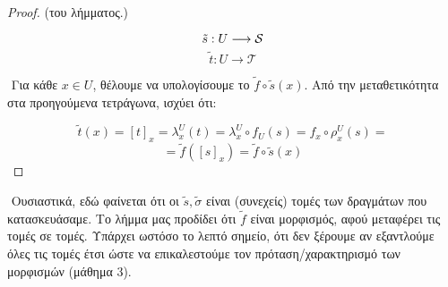 \begin{proof} (του λήμματος.)

    $$\tilde{s}:U \longrightarrow \mathcal{S}$$
    $$\tilde{t}: U \longrightarrow \mathcal{T}$$

    \begin{figure}[H]
        \centering
    \end{figure}

    $ $\newline
    Για κάθε $x \in U$, θέλουμε να υπολογίσουμε το $\tilde{f}\circ\tilde{s}(x)$. Από την μεταθετικότητα στα προηγούμενα τετράγωνα, ισχύει ότι:

    $$\tilde{t}(x) = [t]_x = \lambda^U_x(t) = \lambda^U_x \circ f_U(s) = f_x \circ \rho^U_x (s) = $$
    $$ = \tilde{f}\left([s]_x\right) = \tilde{f}\circ \tilde{s}(x)$$
\end{proof}

$ $\newline
Ουσιαστικά, εδώ φαίνεται ότι οι $\tilde{s},\tilde{\sigma}$ είναι (συνεχείς) τομές των δραγμάτων που κατασκευάσαμε. Το λήμμα μας προδίδει ότι $\tilde{f}$ είναι μορφισμός, αφού μεταφέρει τις τομές σε τομές. Υπάρχει ωστόσο το λεπτό σημείο, ότι δεν ξέρουμε αν εξαντλούμε όλες τις τομές έτσι ώστε να επικαλεστούμε τον πρόταση/χαρακτηρισμό των μορφισμών (μάθημα 3). 


